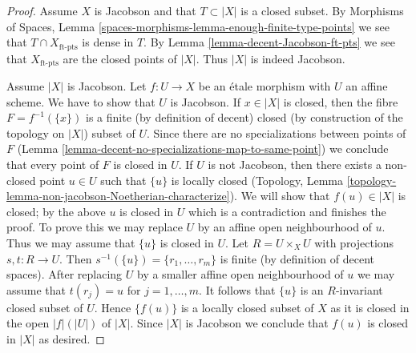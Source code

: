 \documentclass{stacks-project}
\theoremstyle{plain}
\theoremstyle{definition}
\theoremstyle{remark}
\numberwithin{equation}{subsection}
\begin{document}
\begin{proof}
Assume $X$ is Jacobson and that $T \subset |X|$ is a closed subset.
By Morphisms of Spaces, Lemma
\ref{spaces-morphisms-lemma-enough-finite-type-points}
we see that $T \cap X_{\text{ft-pts}}$ is dense in $T$.
By Lemma \ref{lemma-decent-Jacobson-ft-pts} we see that
$X_{\text{ft-pts}}$ are the
closed points of $|X|$. Thus $|X|$ is indeed Jacobson.

\medskip\noindent
Assume $|X|$ is Jacobson. Let $f : U \to X$ be an \'etale
morphism with $U$ an affine scheme. We have to show that $U$
is Jacobson. If $x \in |X|$ is closed,
then the fibre $F = f^{-1}(\{x\})$ is a finite (by definition of
decent) closed (by construction of the topology on $|X|$) subset of $U$.
Since there are no specializations between points of $F$
(Lemma \ref{lemma-decent-no-specializations-map-to-same-point})
we conclude that every point of $F$ is closed in $U$.
If $U$ is not Jacobson, then there exists a non-closed point
$u \in U$ such that $\{u\}$ is locally closed (Topology, Lemma
\ref{topology-lemma-non-jacobson-Noetherian-characterize}).
We will show that $f(u) \in |X|$ is closed; by the above $u$
is closed in $U$ which is a contradiction and finishes
the proof. To prove this we may replace $U$ by an affine open
neighbourhood of $u$.
Thus we may assume that $\{u\}$ is closed in $U$.
Let $R = U \times_X U$ with projections $s, t : R \to U$.
Then $s^{-1}(\{u\}) = \{r_1, \ldots, r_m\}$ is finite (by
definition of decent spaces). After replacing $U$ by a smaller affine
open neighbourhood of $u$ we may assume that $t(r_j) = u$ for
$j = 1, \ldots, m$. It follows that $\{u\}$ is an $R$-invariant
closed subset of $U$. Hence $\{f(u)\}$ is a locally closed subset
of $X$ as it is closed in the open $|f|(|U|)$ of $|X|$. Since $|X|$
is Jacobson we conclude that $f(u)$ is closed in $|X|$ as desired.
\end{proof}
\end{document}
